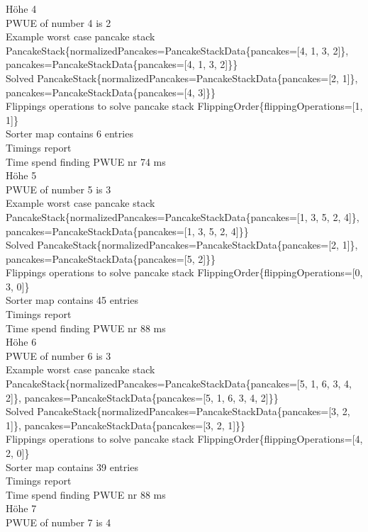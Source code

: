 Höhe 4 \\
PWUE of number 4 is 2 \\
Example worst case pancake stack PancakeStack\{normalizedPancakes=PancakeStackData\{pancakes=[4, 1, 3, 2]\}, pancakes=PancakeStackData\{pancakes=[4, 1, 3, 2]\}\} \\
Solved PancakeStack\{normalizedPancakes=PancakeStackData\{pancakes=[2, 1]\}, pancakes=PancakeStackData\{pancakes=[4, 3]\}\} \\
Flippings operations to solve pancake stack FlippingOrder\{flippingOperations=[1, 1]\} \\
Sorter map contains 6 entries \\
Timings report \\
Time spend finding PWUE nr 74 ms \\
Höhe 5 \\
PWUE of number 5 is 3 \\
Example worst case pancake stack PancakeStack\{normalizedPancakes=PancakeStackData\{pancakes=[1, 3, 5, 2, 4]\}, pancakes=PancakeStackData\{pancakes=[1, 3, 5, 2, 4]\}\} \\
Solved PancakeStack\{normalizedPancakes=PancakeStackData\{pancakes=[2, 1]\}, pancakes=PancakeStackData\{pancakes=[5, 2]\}\} \\
Flippings operations to solve pancake stack FlippingOrder\{flippingOperations=[0, 3, 0]\} \\
Sorter map contains 45 entries \\
Timings report \\
Time spend finding PWUE nr 88 ms \\
Höhe 6 \\
PWUE of number 6 is 3 \\
Example worst case pancake stack PancakeStack\{normalizedPancakes=PancakeStackData\{pancakes=[5, 1, 6, 3, 4, 2]\}, pancakes=PancakeStackData\{pancakes=[5, 1, 6, 3, 4, 2]\}\} \\
Solved PancakeStack\{normalizedPancakes=PancakeStackData\{pancakes=[3, 2, 1]\}, pancakes=PancakeStackData\{pancakes=[3, 2, 1]\}\} \\
Flippings operations to solve pancake stack FlippingOrder\{flippingOperations=[4, 2, 0]\} \\
Sorter map contains 39 entries \\
Timings report \\
Time spend finding PWUE nr 88 ms \\
Höhe 7 \\
PWUE of number 7 is 4 \\
